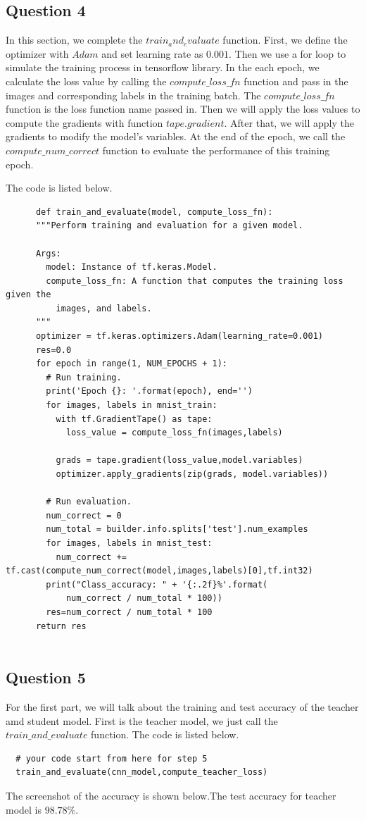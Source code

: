 \documentclass[conference]{IEEEtran}
\begin{document}
  \subsection{Question 4}
  In this section, we complete the $train_and_evaluate$ function.
  First, we define the optimizer with $Adam$ and set learning rate as $0.001$.
  Then we use a for loop to simulate the training process in tensorflow library.
  In the each epoch, we calculate the loss value by calling the $compute\_loss\_fn$ function and pass in the images and corresponding labels in the training batch.
  The $compute\_loss\_fn$ function is the loss function name passed in.
  Then we will apply the loss values to compute the gradients with function $tape.gradient$. 
  After that, we will apply the gradients to modify the model's variables.
  At the end of the epoch, we call the $compute\_num\_correct$ function to evaluate the performance of this training epoch.\par
  The code is listed below.
  \begin{lstlisting}
      def train_and_evaluate(model, compute_loss_fn):
      """Perform training and evaluation for a given model.
    
      Args:
        model: Instance of tf.keras.Model.
        compute_loss_fn: A function that computes the training loss given the
          images, and labels.
      """
      optimizer = tf.keras.optimizers.Adam(learning_rate=0.001)
      res=0.0
      for epoch in range(1, NUM_EPOCHS + 1):
        # Run training.
        print('Epoch {}: '.format(epoch), end='')
        for images, labels in mnist_train:
          with tf.GradientTape() as tape:
            loss_value = compute_loss_fn(images,labels)
    
          grads = tape.gradient(loss_value,model.variables)
          optimizer.apply_gradients(zip(grads, model.variables))
    
        # Run evaluation.
        num_correct = 0
        num_total = builder.info.splits['test'].num_examples
        for images, labels in mnist_test:
          num_correct += tf.cast(compute_num_correct(model,images,labels)[0],tf.int32)
        print("Class_accuracy: " + '{:.2f}%'.format(
            num_correct / num_total * 100))
        res=num_correct / num_total * 100
      return res
        
  \end{lstlisting}
  \subsection{Question 5}
  For the first part, we will talk about the training and test accuracy of the teacher amd student model.
  First is the teacher model, we just call the $train\_and\_evaluate$ function. The code is listed below.
  \begin{lstlisting}
  # your code start from here for step 5 
  train_and_evaluate(cnn_model,compute_teacher_loss)
  \end{lstlisting}
  The screenshot of the accuracy is shown below.The test accuracy for teacher model is $98.78\%$.
  
\end{document}
